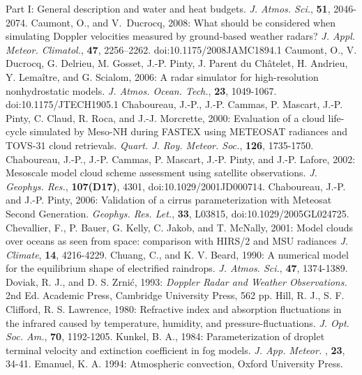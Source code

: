       Part I: General description and water and heat budgets.
      {\it J. Atmos. Sci.},
      {\bf 51},
      2046-2074.
\decrefname
Caumont, O., and V.~Ducrocq, 2008: What should be considered when simulating
  {Doppler} velocities measured by ground-based weather radars\string? {\em J.
  Appl. Meteor. Climatol.}, {\bf 47}, 2256--2262. doi:10.1175/2008JAMC1894.1
\decrefname
Caumont, O., V. Ducrocq, G. Delrieu, M. Gosset, J.-P. Pinty, J. Parent du Ch\^atelet, 
      H. Andrieu, Y. Lema\^itre, and G. Scialom, 2006:
      A radar simulator for high-resolution nonhydrostatic models.
      {\it J. Atmos. Ocean. Tech.},
      {\bf 23},
      1049-1067. doi:10.1175/JTECH1905.1
\decrefname
Chaboureau, J.-P., J.-P. Cammas, P. Mascart, J.-P. Pinty, C. Claud, R. Roca, 
and J.-J. Morcrette, 2000: Evaluation of a cloud life-cycle simulated by
Meso-NH during FASTEX using METEOSAT radiances and TOVS-31 cloud retrievals.
      {\it Quart. J. Roy. Meteor. Soc.}, 
      {\bf 126},
      1735-1750.
\decrefname
Chaboureau, J.-P., J.-P. Cammas, P. Mascart, J.-P. Pinty, and J.-P. Lafore, 2002: Mesoscale model cloud scheme assessment using satellite observations.
      {\it J. Geophys. Res.}, 
      {\bf 107(D17)},
      4301, doi:10.1029/2001JD000714.
\decrefname
Chaboureau, J.-P. and J.-P. Pinty, 2006:
      Validation of a cirrus parameterization with Meteosat Second Generation.
      {\it Geophys. Res. Let.}, {\bf 33}, L03815, doi:10.1029/2005GL024725.
\decrefname
Chevallier, F., P. Bauer, G. Kelly, C. Jakob, and T. McNally, 2001:
      Model clouds over oceans as seen from space:
      comparison with HIRS/2 and MSU radiances
      {\it J. Climate}, 
      {\bf 14},
      4216-4229.
\decrefname
Chuang, C., and K. V. Beard, 1990:
      A numerical model for the equilibrium shape of electrified raindrops.
      {\it J. Atmos. Sci.},
      {\bf 47},
      1374-1389.
\decrefname
Doviak, R. J., and D. S. Zrni\'c, 1993:
      \textit{Doppler Radar and Weather Observations.}
      2nd Ed.
      Academic Press,
      Cambridge University Press,
      562 pp.
\decrefname
Hill, R. J., S. F. Clifford, R. S. Lawrence, 1980:
      Refractive index and absorption fluctuations in the infrared 
      caused by temperature, humidity, and pressure-fluctuations.
      {\it J. Opt. Soc. Am.}, 
      {\bf 70},
      1192-1205.  
\decrefname
Kunkel, B. A., 1984: Parameterization of droplet terminal velocity and
extinction coefficient in fog models.
     {\it J. App. Meteor. },
      {\bf 23},
      34-41.     
\decrefname
Emanuel, K. A. 1994: Atmospheric convection, Oxford University Press.
